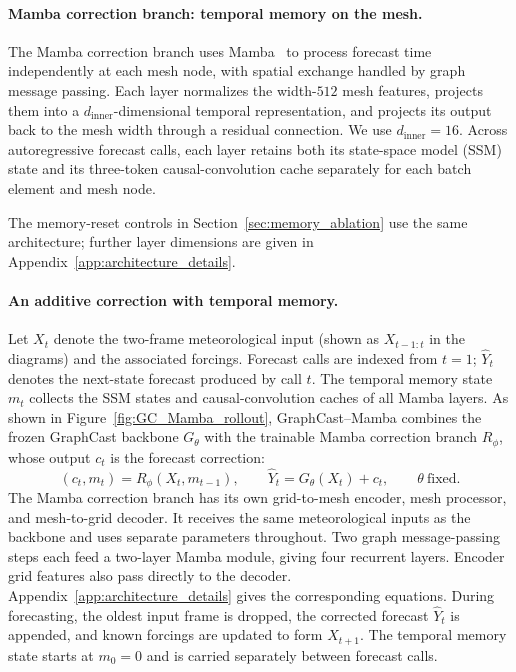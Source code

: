 \documentclass{article}
\newcommand{\vfourchange}[1]{{\color{blue}#1}}
\begin{document}
\paragraph{{Mamba correction branch: temporal memory on the mesh.}}
The Mamba correction branch uses Mamba~\citep{gu2023mamba} to process forecast time independently at each mesh node, with spatial exchange handled by graph message passing. Each layer normalizes the width-$512$ mesh features, projects them into a $d_{\mathrm{inner}}$-dimensional temporal representation, and projects its output back to the mesh width through a residual connection. We use $d_{\mathrm{inner}}=16$. Across autoregressive forecast calls, each layer retains both its {state-space model (SSM) state} and its three-token causal-convolution cache separately for each batch element and mesh node.

\vfourchange{The memory-reset controls in Section~\ref{sec:memory_ablation} use the same architecture; further layer dimensions are given in Appendix~\ref{app:architecture_details}.}


\paragraph{An additive correction with temporal memory.}
Let $X_t$ denote the two-frame meteorological input (shown as $X_{t-1:t}$ in the diagrams) and the associated forcings. Forecast calls are indexed from $t=1$; $\hat{Y}_t$ denotes the next-state forecast produced by call $t$. The temporal memory state $m_t$ collects the SSM states and causal-convolution caches of all Mamba layers. As shown in Figure~\ref{fig:GC_Mamba_rollout}, {GraphCast--Mamba combines the frozen GraphCast backbone $G_\theta$ with the trainable Mamba correction branch $R_\phi$, whose output $c_t$ is the forecast correction}:
\vspace{-4pt}
\begin{equation}
    (c_t,m_t)=R_\phi(X_t,m_{t-1}),
    \qquad
    \hat{Y}_t=G_\theta(X_t)+c_t,
    \qquad \theta\ \text{fixed}.
    \label{eq:additive_correction}
\end{equation}
\vfourchange{The Mamba correction branch has its own grid-to-mesh encoder, mesh processor, and mesh-to-grid decoder. It receives the same meteorological inputs as the backbone and uses separate parameters throughout. Two graph message-passing steps each feed a two-layer Mamba module, giving four recurrent layers. Encoder grid features also pass directly to the decoder. Appendix~\ref{app:architecture_details} gives the corresponding equations. During forecasting, the oldest input frame is dropped, the corrected forecast $\hat{Y}_t$ is appended, and known forcings are updated to form $X_{t+1}$. The temporal memory state starts at $m_0=0$ and is carried separately between forecast calls.}
\end{document}
